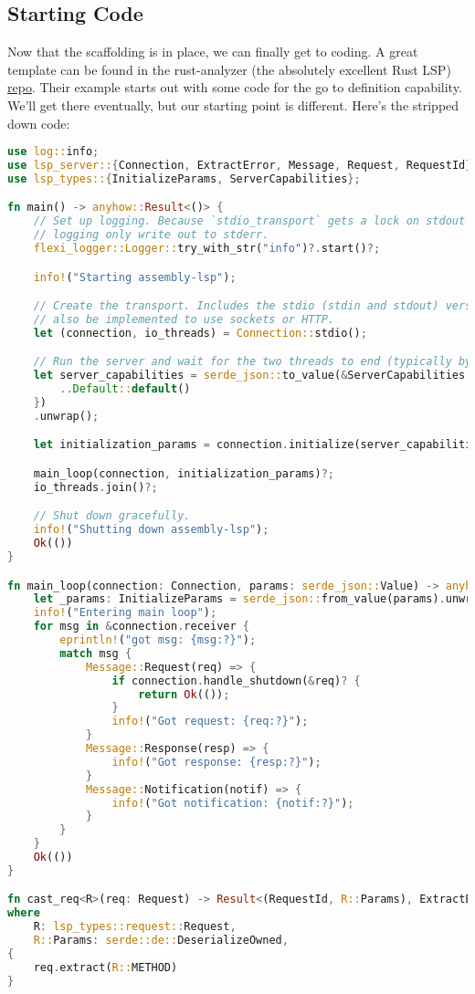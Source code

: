 \subsection{Starting Code}

Now that the scaffolding is in place, we can finally get to coding. A great template
can be found in the rust-analyzer (the absolutely excellent Rust LSP)
\href{https://github.com/rust-lang/rust-analyzer/tree/master/lib/lsp-server}{repo}.
Their example starts out with some code for the go to definition capability. We'll
get there eventually, but our starting point is different. Here's the stripped down code:

\begin{lstlisting}[language=rust]
use log::info;
use lsp_server::{Connection, ExtractError, Message, Request, RequestId};
use lsp_types::{InitializeParams, ServerCapabilities};

fn main() -> anyhow::Result<()> {
    // Set up logging. Because `stdio_transport` gets a lock on stdout and stdin, we must have our
    // logging only write out to stderr.
    flexi_logger::Logger::try_with_str("info")?.start()?;

    info!("Starting assembly-lsp");

    // Create the transport. Includes the stdio (stdin and stdout) versions but this could
    // also be implemented to use sockets or HTTP.
    let (connection, io_threads) = Connection::stdio();

    // Run the server and wait for the two threads to end (typically by trigger LSP Exit event).
    let server_capabilities = serde_json::to_value(&ServerCapabilities {
        ..Default::default()
    })
    .unwrap();

    let initialization_params = connection.initialize(server_capabilities)?;

    main_loop(connection, initialization_params)?;
    io_threads.join()?;

    // Shut down gracefully.
    info!("Shutting down assembly-lsp");
    Ok(())
}

fn main_loop(connection: Connection, params: serde_json::Value) -> anyhow::Result<()> {
    let _params: InitializeParams = serde_json::from_value(params).unwrap();
    info!("Entering main loop");
    for msg in &connection.receiver {
        eprintln!("got msg: {msg:?}");
        match msg {
            Message::Request(req) => {
                if connection.handle_shutdown(&req)? {
                    return Ok(());
                }
                info!("Got request: {req:?}");
            }
            Message::Response(resp) => {
                info!("Got response: {resp:?}");
            }
            Message::Notification(notif) => {
                info!("Got notification: {notif:?}");
            }
        }
    }
    Ok(())
}

fn cast_req<R>(req: Request) -> Result<(RequestId, R::Params), ExtractError<Request>>
where
    R: lsp_types::request::Request,
    R::Params: serde::de::DeserializeOwned,
{
    req.extract(R::METHOD)
}
\end{lstlisting}

